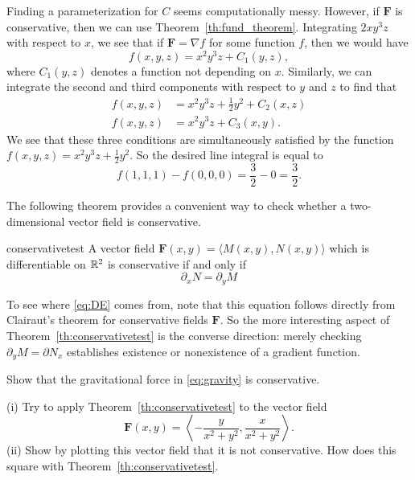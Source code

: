 \documentclass{watsonbook}
\begin{document}
\begin{solution}
  Finding a parameterization for $C$ seems computationally messy.
  However, if $\mathbf{F}$ is conservative, then we can use
  Theorem~\ref{th:fund_theorem}. Integrating $2  x y^{3} z$ with
  respect to $x$, we see that if $\mathbf{F} = \nabla f$ for some
  function $f$, then we would have 
  \[
    f(x,y,z) = x^2 y^3 z + C_1(y,z), 
  \]
  where $C_1(y,z)$ denotes a function not depending on $x$. Similarly,
  we can integrate the second and third components with respect to $y$
  and $z$ to find that
  \begin{align*}
    f(x,y,z) &= x^2 y^3 z + \frac{1}{2}y^2 + C_2(x,z) \\
    f(x,y,z) &= x^2 y^3 z + C_3(x,y). 
  \end{align*}
  We see that these three conditions are simultaneously satisfied by
  the function $f(x,y,z) = x^2 y^3 z + \tfrac{1}{2}y^2$. So the
  desired line integral is equal to 
  \[
    f(1,1,1) - f(0,0,0) = \frac{3}{2} - 0  = \boxed{\frac{3}{2}}. 
  \]
\end{solution}

The following theorem provides a convenient way to check whether a
two-dimensional vector field is conservative. 

\begin{theo}{}{conservativetest}
  A vector field $\mathbf{F}(x,y) = \langle M(x,y), N(x,y)\rangle$
  which is differentiable on $\mathbb{R}^2$ is
  conservative if and only if
  \begin{equation} \label{eq:DE}
    \partial_x N = \partial_y M
  \end{equation}
\end{theo}
To see where \eqref{eq:DE} comes from, note that this equation follows directly
from Clairaut's theorem for conservative fields $\mathbf{F}$. 
So the more interesting aspect of Theorem~\ref{th:conservativetest} is
the converse direction: merely checking $\partial_y M = \partial N_x$
establishes existence or nonexistence of a gradient function. 

\begin{exercise}{}{}
  Show that the gravitational force in \eqref{eq:gravity} is
  conservative.
\end{exercise}

\begin{exercise}{}{}
  (i) Try to apply Theorem~\ref{th:conservativetest}  to the vector
  field
  \[
    \mathbf{F}(x,y) = \left\langle
      -\frac{y}{{x^2+y^2}},
      \frac{x}{{x^2+y^2}}
    \right\rangle. 
  \]  
  (ii) Show by plotting this vector field that it is not
  conservative. How does this square with Theorem~\ref{th:conservativetest}. 
\end{exercise}
\end{document}
